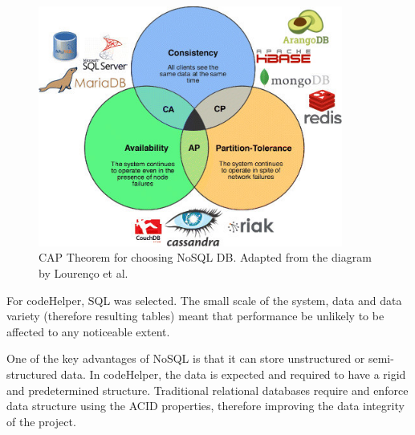 \FloatBarrier
\begin{figure}[H]
    \centering
    \includegraphics[width=10cm]{7design/images/capTheorem.jpeg}
    \caption{CAP Theorem for choosing NoSQL DB. Adapted from the diagram by Lourenço et al\cite{cap}.}
    \label{fig:cap}
\end{figure}

For codeHelper, SQL was selected. The small scale of the system, data and data variety (therefore resulting tables) meant that performance be unlikely to be affected to any noticeable extent. 

One of the key advantages of NoSQL is that it can store unstructured or semi-structured data. In codeHelper, the data is expected and required to have a rigid and predetermined structure. Traditional relational databases require and enforce data structure using the ACID properties, therefore improving the data integrity of the project. 



